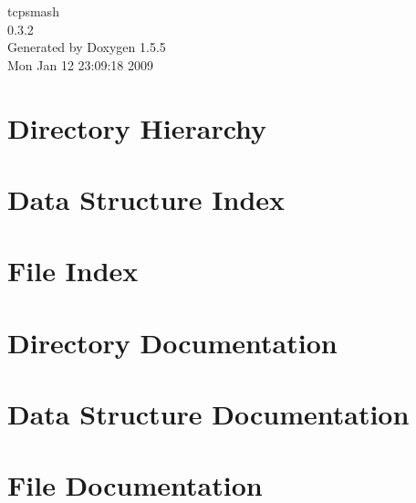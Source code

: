\documentclass[a4paper]{book}
\begin{document}
\begin{titlepage}
\vspace*{7cm}
\begin{center}
{\Large tcpsmash \\[1ex]\large 0.3.2 }\\
\vspace*{1cm}
{\large Generated by Doxygen 1.5.5}\\
\vspace*{0.5cm}
{\small Mon Jan 12 23:09:18 2009}\\
\end{center}
\end{titlepage}
\clearemptydoublepage
{}
\tableofcontents
\clearemptydoublepage
{}
\chapter{Directory Hierarchy}

\chapter{Data Structure Index}

\chapter{File Index}

\chapter{Directory Documentation}


\chapter{Data Structure Documentation}





\chapter{File Documentation}













\printindex
\end{document}
